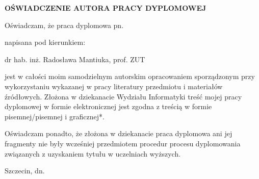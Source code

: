 \begin{titlepage}

\begin{center}
\large
\vspace{3 cm}
\textbf{OŚWIADCZENIE AUTORA PRACY DYPLOMOWEJ}
\end{center} 
 
Oświadczam, że praca dyplomowa  pn.

\begin{center} {}
\end{center}
napisana pod kierunkiem:

\begin{center} {dr hab. inż. Radosława Mantiuka, prof. ZUT}\end{center}

jest w całości moim samodzielnym autorskim opracowaniem sporządzonym przy wykorzystaniu wykazanej w pracy literatury przedmiotu i materiałów źródłowych. Złożona w dziekanacie Wydziału Informatyki treść mojej pracy dyplomowej w formie elektronicznej jest zgodna z treścią w formie pisemnej/pisemnej i graficznej*.

Oświadczam ponadto, że złożona w dziekanacie praca dyplomowa ani jej fragmenty nie były wcześniej przedmiotem procedur procesu dyplomowania związanych z uzyskaniem tytułu  w uczelniach wyższych.

\vspace{2.cm} Szczecin, dn. 
\begin{flushright}
\end{flushright}

\end{titlepage}






